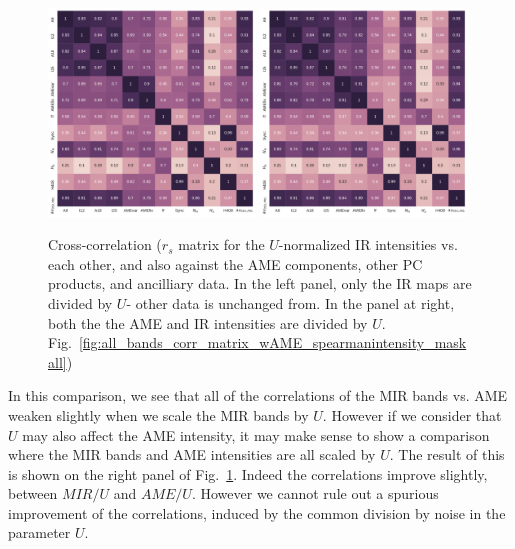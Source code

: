                 \begin{figure}
                    \includegraphics[width=0.49\textwidth,trim={0.2cm 0 0.25cm 0 },clip]{../Plots/ch_allsky/all_bands_corr_matrix_wAME_spearmanU_norm_masked.pdf}
                    \includegraphics[width=0.49\textwidth,trim={0.2cm 0 0.25cm 0 },clip]{../Plots/ch_allsky/all_bands_corr_matrix_wAME_spearmanU_norm_AMEnorm_masked.pdf}
                    \centering
                    \caption{Cross-correlation ($r_{s}$ matrix for the $U$-normalized IR intensities vs. each other, and also against the AME components, other PC products, and ancilliary data. In the left panel, only the IR maps are divided by $U$- other data is unchanged from. In the panel at right, both the the AME and IR intensities are divided by $U$. Fig.~\ref{fig:all_bands_corr_matrix_wAME_spearmanintensity_maskall})}
                    \label{fig:all_bands_corr_matrix_wAME_spearmanU_norm_masked}
                \end{figure}
            In this comparison, we see that all of the correlations of the MIR bands vs. AME weaken slightly when we scale the MIR bands by $U$. However if we consider that $U$ may also affect the AME intensity, it may make sense to show a comparison where the MIR bands and AME intensities are all scaled by $U$. The result of this is shown on the right panel of Fig.~\ref{fig:all_bands_corr_matrix_wAME_spearmanU_norm_masked}. Indeed the correlations improve slightly, between $MIR/U$ and $AME/U$. However we cannot rule out a spurious improvement of the correlations, induced by the common division by noise in the parameter $U$.

